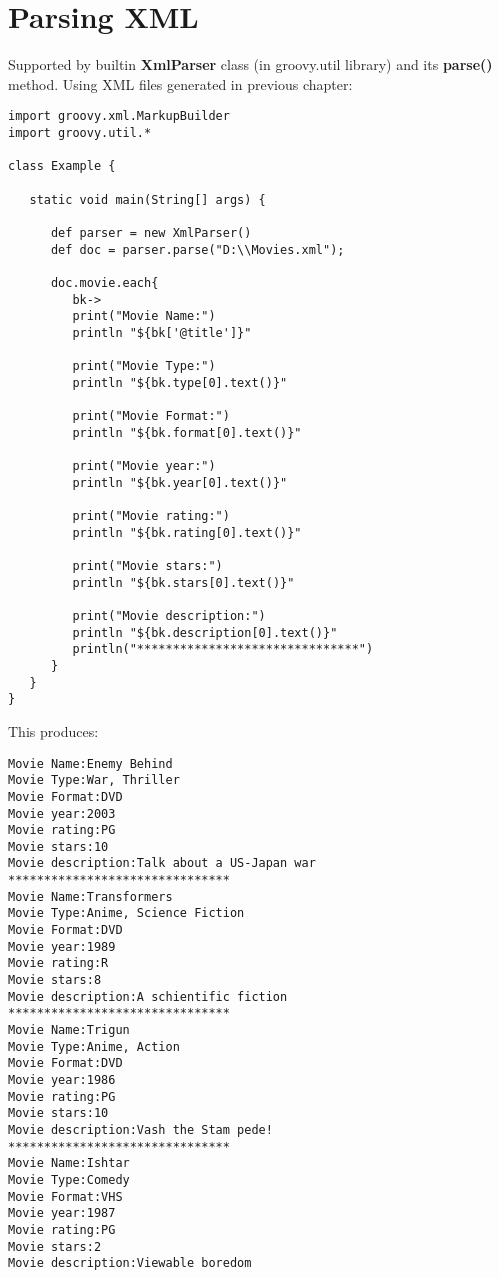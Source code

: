 \documentclass{report}
\begin{document}
\chapter{Parsing XML}
Supported by builtin \textbf{XmlParser} class (in groovy.util library) and its
\textbf{parse()} method.
Using XML files generated in previous chapter:
\begin{verbatim}
import groovy.xml.MarkupBuilder 
import groovy.util.*

class Example {

   static void main(String[] args) { 
	
      def parser = new XmlParser()
      def doc = parser.parse("D:\\Movies.xml");
		
      doc.movie.each{
         bk->
         print("Movie Name:")
         println "${bk['@title']}"
			
         print("Movie Type:")
         println "${bk.type[0].text()}"
			
         print("Movie Format:")
         println "${bk.format[0].text()}"
			
         print("Movie year:")
         println "${bk.year[0].text()}"
			
         print("Movie rating:")
         println "${bk.rating[0].text()}"
			
         print("Movie stars:")
         println "${bk.stars[0].text()}"
			
         print("Movie description:")
         println "${bk.description[0].text()}"
         println("*******************************")
      }
   }
}
\end{verbatim}

This produces:
\begin{verbatim}
Movie Name:Enemy Behind 
Movie Type:War, Thriller 
Movie Format:DVD 
Movie year:2003 
Movie rating:PG 
Movie stars:10 
Movie description:Talk about a US-Japan war 
******************************* 
Movie Name:Transformers 
Movie Type:Anime, Science Fiction 
Movie Format:DVD 
Movie year:1989 
Movie rating:R 
Movie stars:8 
Movie description:A schientific fiction 
******************************* 
Movie Name:Trigun 
Movie Type:Anime, Action
Movie Format:DVD 
Movie year:1986 
Movie rating:PG 
Movie stars:10 
Movie description:Vash the Stam pede! 
******************************* 
Movie Name:Ishtar 
Movie Type:Comedy 
Movie Format:VHS 
Movie year:1987 
Movie rating:PG 
Movie stars:2 
Movie description:Viewable boredom
\end{verbatim}
 
\end{document}
